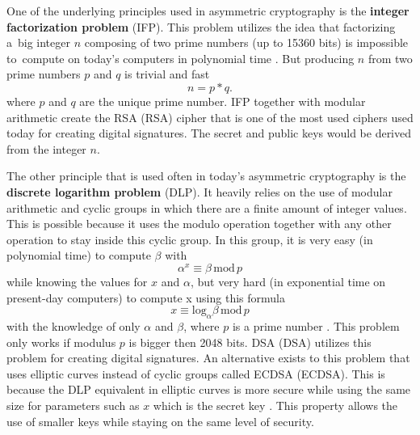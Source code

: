 One of the underlying principles used in asymmetric cryptography is the \textbf{integer factorization problem} (\acs{IFP}). This problem utilizes the idea that factorizing a~big integer $n$ composing of two prime numbers (up to 15360 bits) is impossible to~compute on today's computers in polynomial time \cite{Paar2010}. But producing $n$ from two prime numbers $p$ and $q$ is trivial and fast
\begin{equation}
  n=p*q.
\end{equation}
where $p$ and $q$ are the unique prime number. IFP together with modular arithmetic create the RSA (\acl{RSA}) cipher that is one of the most used ciphers used today for creating digital signatures. The secret and public keys would be derived from the integer $n$.

The other principle that is used often in today's asymmetric cryptography is the \textbf{discrete logarithm problem} (\acs{DLP}). It heavily relies on the use of modular arithmetic and cyclic groups in which there are a finite amount of integer values. This is possible because it uses the modulo operation together with any other operation to stay inside this cyclic group. In this group, it is very easy (in polynomial time) to compute $\beta$ with
\begin{equation}
  \alpha^x\equiv\beta\,\mathrm{mod}\,p
\end{equation}
while knowing the values for $x$ and $\alpha$, but very hard (in exponential time on present-day computers) to compute x using this formula
\begin{equation}
  x\equiv\mathrm{log}_\alpha\beta\,\mathrm{mod}\,p
\end{equation}
with the knowledge of only $\alpha$ and $\beta$, where $p$ is a prime number \cite{Paar2010}. This problem only works if modulus $p$ is bigger then 2048 bits. DSA (\acl{DSA}) utilizes this problem for creating digital signatures. An alternative exists to this problem that uses elliptic curves instead of cyclic groups called ECDSA (\acl{ECDSA}). This is because the DLP equivalent in elliptic curves is more secure while using the same size for parameters such as $x$ which is the secret key \cite{Ristic2014}. This property allows the use of smaller keys while staying on the same level of security.
